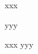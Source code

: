 

{\mktsHOne{}xxx\mktsHOneBEG}%

{\mktsHTwo{}yyy\mktsHTwoBEG}%
\begin{mktsToc}%
{\mktsHOne{}xxx\mktsHOneBEG}%
{\mktsHTwo{}yyy\mktsHTwoBEG}%
\end{mktsToc}%



